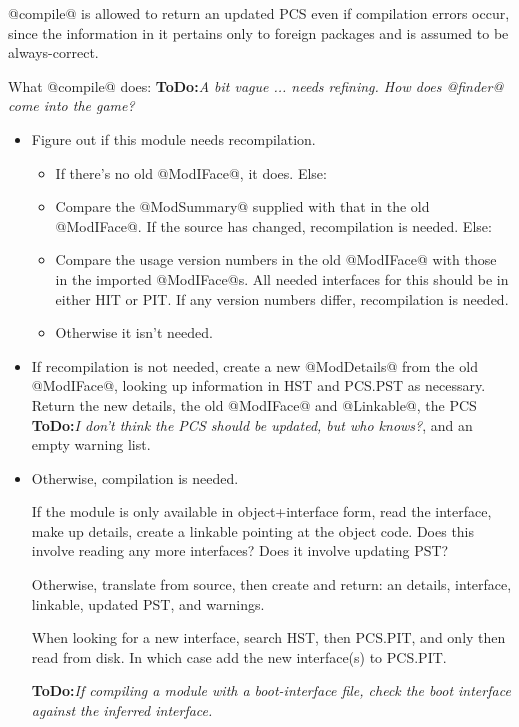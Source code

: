\documentclass[11pt]{article}
\newcommand{\ToDo}[1]{{{\bf ToDo:}\sl #1}}
\begin{document}
@compile@ is allowed to return an updated PCS even if compilation
errors occur, since the information in it pertains only to foreign
packages and is assumed to be always-correct.

What @compile@ does: \ToDo{A bit vague ... needs refining.  How does
                           @finder@ come into the game?}
\begin{itemize}
\item Figure out if this module needs recompilation.
   \begin{itemize}
   \item If there's no old @ModIFace@, it does.  Else:
   \item Compare the @ModSummary@ supplied with that in the
         old @ModIFace@.  If the source has changed, recompilation
         is needed.  Else:
   \item Compare the usage version numbers in the old @ModIFace@ with
         those in the imported @ModIFace@s.  All needed interfaces
         for this should be in either HIT or PIT.  If any version
         numbers differ, recompilation is needed.
   \item Otherwise it isn't needed.   
   \end{itemize}

\item
   If recompilation is not needed, create a new @ModDetails@ from the
   old @ModIFace@, looking up information in HST and PCS.PST as necessary.
   Return the new details, the old @ModIFace@ and @Linkable@, the PCS
   \ToDo{I don't think the PCS should be updated, but who knows?}, and
   an empty warning list.

\item
   Otherwise, compilation is needed.  

   If the module is only available in object+interface form, read the
   interface, make up details, create a linkable pointing at the
   object code.  Does this involve reading any more interfaces?  Does
   it involve updating PST?
   
   Otherwise, translate from source, then create and return: an
   details, interface, linkable, updated PST, and warnings.

   When looking for a new interface, search HST, then PCS.PIT, and only
   then read from disk.  In which case add the new interface(s) to
   PCS.PIT.  
   
   \ToDo{If compiling a module with a boot-interface file, check the 
   boot interface against the inferred interface.}
\end{itemize}
\end{document}
